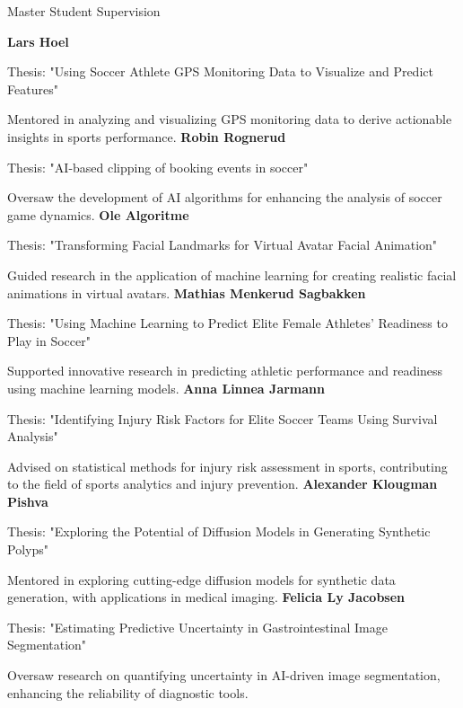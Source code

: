 \begin{rubric}{Master Student Supervision}

    \entry*[2023]%
    \textbf{Lars Hoel} \par
    Thesis: "Using Soccer Athlete GPS Monitoring Data to Visualize and Predict Features" \par
    Mentored in analyzing and visualizing GPS monitoring data to derive actionable insights in sports performance.
    \entry*[2023]%
    \textbf{Robin Rognerud} \par
    Thesis: "AI-based clipping of booking events in soccer" \par
    Oversaw the development of AI algorithms for enhancing the analysis of soccer game dynamics.
    \entry*[2023]%
    \textbf{Ole Algoritme} \par
    Thesis: "Transforming Facial Landmarks for Virtual Avatar Facial Animation" \par
    Guided research in the application of machine learning for creating realistic facial animations in virtual avatars.
    \entry*[2023]%
    \textbf{Mathias Menkerud Sagbakken} \par
    Thesis: "Using Machine Learning to Predict Elite Female Athletes' Readiness to Play in Soccer" \par
    Supported innovative research in predicting athletic performance and readiness using machine learning models.
    \entry*[2023]%
    \textbf{Anna Linnea Jarmann} \par
    Thesis: "Identifying Injury Risk Factors for Elite Soccer Teams Using Survival Analysis" \par
    Advised on statistical methods for injury risk assessment in sports, contributing to the field of sports analytics and injury prevention.
    \entry*[2023]%
    \textbf{Alexander Klougman Pishva} \par
    Thesis: "Exploring the Potential of Diffusion Models in Generating Synthetic Polyps" \par
    Mentored in exploring cutting-edge diffusion models for synthetic data generation, with applications in medical imaging.
    \entry*[2022]%
    \textbf{Felicia Ly Jacobsen} \par
    Thesis: "Estimating Predictive Uncertainty in Gastrointestinal Image Segmentation" \par
    Oversaw research on quantifying uncertainty in AI-driven image segmentation, enhancing the reliability of diagnostic tools.
    \entry*[2021]%

\end{rubric}
